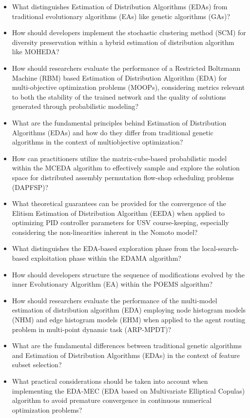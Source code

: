 \begin{itemize}[noitemsep]
    \item What distinguishes Estimation of Distribution Algorithms (EDAs) from traditional evolutionary algorithms (EAs) like genetic algorithms (GAs)?
    \item How should developers implement the stochastic clustering method (SCM) for diversity preservation within a hybrid estimation of distribution algorithm like MOHEDA?
    \item How should researchers evaluate the performance of a Restricted Boltzmann Machine (RBM) based Estimation of Distribution Algorithm (EDA) for multi-objective optimization problems (MOOPs), considering metrics relevant to both the stability of the trained network and the quality of solutions generated through probabilistic modeling?
    \item What are the fundamental principles behind Estimation of Distribution Algorithms (EDAs) and how do they differ from traditional genetic algorithms in the context of multiobjective optimization?
    \item How can practitioners utilize the matrix-cube-based probabilistic model within the MCEDA algorithm to effectively sample and explore the solution space for distributed assembly permutation flow-shop scheduling problems (DAPFSP)?
    \item What theoretical guarantees can be provided for the convergence of the Elitism Estimation of Distribution Algorithm (EEDA) when applied to optimizing PID controller parameters for USV course-keeping, especially considering the non-linearities inherent in the Nomoto model?
    \item What distinguishes the EDA-based exploration phase from the local-search-based exploitation phase within the EDAMA algorithm?
    \item How should developers structure the sequence of modifications evolved by the inner Evolutionary Algorithm (EA) within the POEMS algorithm?
    \item How should researchers evaluate the performance of the multi-model estimation of distribution algorithm (EDA) employing node histogram models (NHM) and edge histogram models (EHM) when applied to the agent routing problem in multi-point dynamic task (ARP-MPDT)?
    \item What are the fundamental differences between traditional genetic algorithms and Estimation of Distribution Algorithms (EDAs) in the context of feature subset selection?
    \item What practical considerations should be taken into account when implementing the EDA-MEC (EDA based on Multivariate Elliptical Copulas) algorithm to avoid premature convergence in continuous numerical optimization problems?

\end{itemize}
